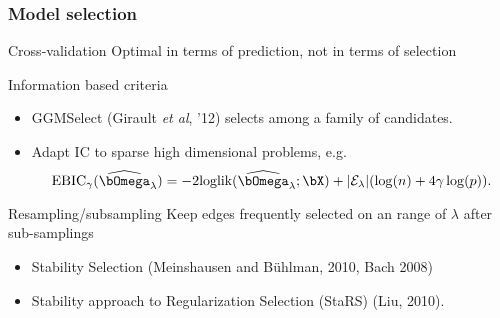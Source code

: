 \begin{frame}
  \frametitle{Model selection}
  
  \begin{block}{Cross-validation}
    Optimal in terms of \alert{prediction}, not in terms of selection
  \end{block}

  \begin{block}{Information based criteria}
    \begin{itemize}
    \item GGMSelect (Girault \textit{et al}, '12) selects among a family of candidates.
    \item Adapt IC to sparse high dimensional problems, e.g.
    \begin{equation*}
      \text{EBIC}_\gamma(\widehat{{\boldsymbol\invcov}}_\lambda)  =   -2 \textrm{loglik}
      (\widehat{{\boldsymbol\invcov}}_\lambda;\bX) + |\mathcal{E}_\lambda| (\log(n) + 4 \gamma \log(p) ).
    \end{equation*}
    \end{itemize}
  \end{block}

  \begin{block}{Resampling/subsampling}
    \alert{Keep edges frequently selected} on an range of $\lambda$ after sub-samplings
    \begin{itemize}
    \item Stability Selection (Meinshausen and B\"uhlman, 2010, Bach 2008)
    \item Stability approach to Regularization Selection (StaRS) (Liu, 2010).
    \end{itemize}
  \end{block}
\end{frame}




